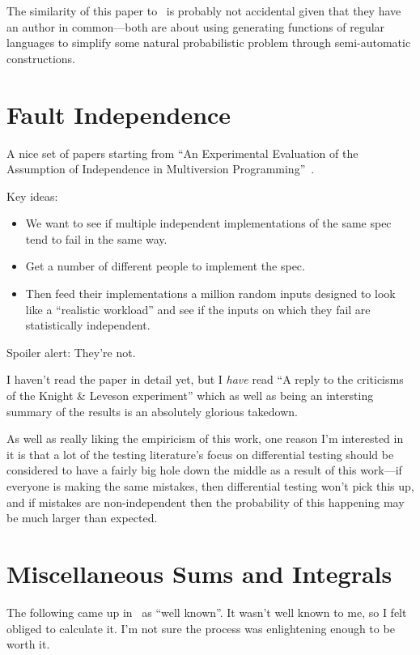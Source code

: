 \documentclass[a4paper]{article}
\begin{document}
The similarity of this paper to~\cite{DBLP:journals/dam/FlajoletGT92} is probably not accidental given that they have an author in common---both
are about using generating functions of regular languages to simplify some natural probabilistic problem through semi-automatic constructions.

\section{Fault Independence}

A nice set of papers starting from ``An Experimental Evaluation of the Assumption of Independence in Multiversion Programming''~\cite{DBLP:journals/tse/KnightL86}.

Key ideas:

\begin{itemize}
\item We want to see if multiple independent implementations of the same spec tend to fail in the same way.
\item Get a number of different people to implement the spec.
\item Then feed their implementations a million random inputs designed to look like a ``realistic workload'' and see if the inputs on which they fail are statistically independent.
\end{itemize}

Spoiler alert: They're not.

I haven't read the paper in detail yet,
but I \emph{have} read ``A reply to the criticisms of the Knight \& Leveson experiment''\cite{knight1990reply} which as well as being an intersting summary of the results is an absolutely glorious takedown.

As well as really liking the empiricism of this work,
one reason I'm interested in it is that a lot of the testing literature's focus on differential testing should be considered to have a fairly big hole down the middle as a result of this work---if everyone is making the same mistakes,
then differential testing won't pick this up,
and if mistakes are non-independent then the probability of this happening may be much larger than expected.

\section{Miscellaneous Sums and Integrals}

The following came up in~\cite{DBLP:journals/dam/FlajoletGT92} as ``well known''.
It wasn't well known to me,
so I felt obliged to calculate it.
I'm not sure the process was enlightening enough to be worth it.
\end{document}
